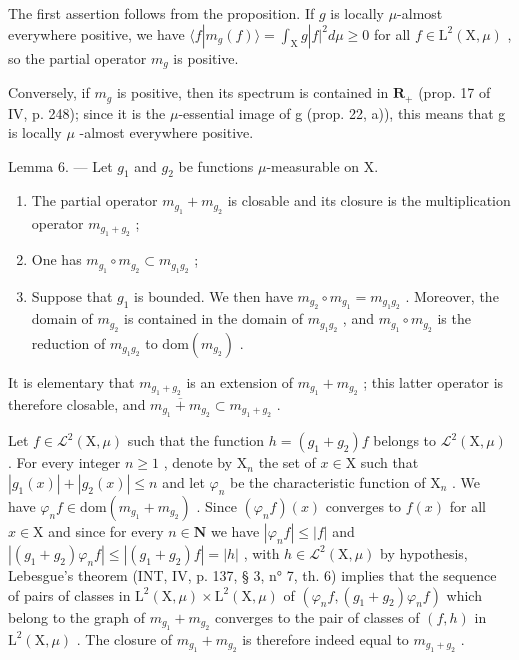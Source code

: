 The first assertion follows from the proposition. If \(g\) is locally \(\mu\)-almost everywhere positive, we have \(\langle f|m_{g}(f)\rangle=\int_{\mathrm{X}}g|f|^{2}d\mu\geqslant0\) for all \(f\in\mathrm{L}^{2}(\mathrm{X},\mu)\) , so the partial operator \(m_{g}\) is positive.

Conversely, if \(m_{g}\) is positive, then its spectrum is contained in \(\mathbf{R}_{+}\) (prop. 17 of IV, p. 248); since it is the \(\mu\)-essential image of g (prop. 22, a)), this means that g is locally \(\mu\) -almost everywhere positive.

Lemma 6. --- Let \(g_{1}\) and \(g_{2}\) be functions \(\mu\)-measurable on X.

\begin{enumerate}
\def\labelenumi{\alph{enumi})}
\item
  The partial operator \(m_{g_{1}} + m_{g_{2}}\) is closable and its closure is the multiplication operator \(m_{g_{1}+g_{2}}\) ;
\item
  One has \(m_{g_{1}} \circ m_{g_{2}} \subset m_{g_{1}g_{2}}\) ;
\item
  Suppose that \(g_{1}\) is bounded. We then have \(m_{g_{2}} \circ m_{g_{1}} = m_{g_{1}g_{2}}\) . Moreover, the domain of \(m_{g_{2}}\) is contained in the domain of \(m_{g_{1}g_{2}}\) , and \(m_{g_{1}} \circ m_{g_{2}}\) is the reduction of \(m_{g_{1}g_{2}}\) to \(\text{dom}(m_{g_{2}})\) .
\end{enumerate}

It is elementary that \(m_{g_{1}+g_{2}}\) is an extension of \(m_{g_{1}} + m_{g_{2}}\) ; this latter operator is therefore closable, and \(\overline{m_{g_{1}} + m_{g_{2}}} \subset m_{g_{1}+g_{2}}\) .

Let \(f \in \mathcal{L}^2(\mathrm{X},\mu)\) such that the function \(h = (g_1 + g_2)f\) belongs to \(\mathcal{L}^2(\mathrm{X},\mu)\) . For every integer \(n \geqslant 1\) , denote by \(\mathrm{X}_n\) the set of \(x \in \mathrm{X}\) such that \(|g_1(x)| + |g_2(x)| \leqslant n\) and let \(\varphi_n\) be the characteristic function of \(\mathrm{X}_n\) . We have \(\varphi_n f \in \mathrm{dom}(m_{g_1} + m_{g_2})\) . Since \((\varphi_n f)(x)\) converges to \(f(x)\) for all \(x \in \mathrm{X}\) and since for every \(n \in \mathbf{N}\) we have \(|\varphi_n f| \leqslant |f|\) and \(|(g_1 + g_2)\varphi_n f| \leqslant |(g_1 + g_2)f| = |h|\) , with \(h \in \mathcal{L}^2(\mathrm{X},\mu)\) by hypothesis, Lebesgue's theorem (INT, IV, p. 137, § 3, n° 7, th. 6) implies that the sequence of pairs of classes in \(\mathrm{L}^{2}(\mathrm{X},\mu)\times\mathrm{L}^{2}(\mathrm{X},\mu)\) of \((\varphi_{n}f,(g_{1}+g_{2})\varphi_{n}f)\) which belong to the graph of \(m_{g_{1}}+m_{g_{2}}\) converges to the pair of classes of \((f,h)\) in \(\mathrm{L}^{2}(\mathrm{X},\mu)\) . The closure of \(m_{g_{1}}+m_{g_{2}}\) is therefore indeed equal to \(m_{g_{1}+g_{2}}\) .

